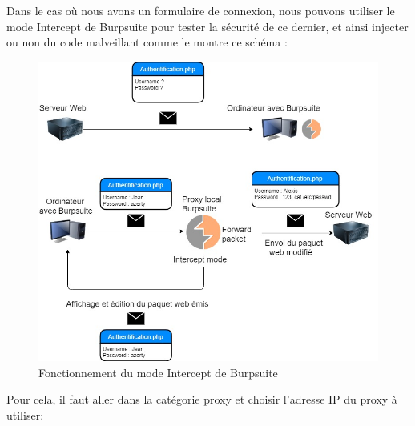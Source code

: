 \noindent Dans le cas où nous avons un formulaire de connexion, nous pouvons utiliser le mode Intercept de Burpsuite pour tester la sécurité de ce dernier, et ainsi injecter ou non du code malveillant comme le montre ce schéma :

\begin{figure}[htp!]
  \centering
  \setlength\figureheight{7cm}
  \setlength\figurewidth{9cm}
  \includegraphics[width=1\textwidth]{oui/Ancien/imangeancien/burpsuite/Burpsuite-Fonctionnement.jpg}
  \caption{Fonctionnement du mode Intercept de Burpsuite}
  \label{fig:courbe-tikz}
\end{figure}

\newpage
\noindent Pour cela, il faut aller dans la catégorie proxy et choisir l’adresse IP du proxy à utiliser:


